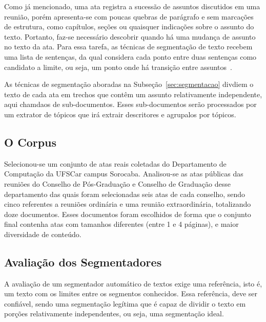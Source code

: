 Como já mencionado, uma ata registra a sucessão de assuntos discutidos em uma reunião, porém apresenta-se com poucas quebras de parágrafo e sem marcações de estrutura, como capítulos, seções ou quaisquer indicações sobre o assunto do texto. Portanto, faz-se necessário descobrir quando há uma mudança de assunto no texto da ata. Para essa tarefa, as técnicas de segmentação de texto recebem uma lista de sentenças, da qual considera cada ponto entre duas sentenças como candidato a limite, ou seja, um ponto onde há transição entre assuntos~\cite{Bokaei2015, Bokaei2016, Misra2009, Sakahara2014}.

As técnicas de segmentação aboradas na Subseção~\ref{sec:segmentacao} divdiem o texto de cada ata em trechos que contêm um assunto relativamente independente, aqui chamdaos de sub-documentos. Esses sub-documentos serão processados por um extrator de tópicos que irá extrair descritores e agrupalos por tópicos.









\subsection{O Corpus}


Selecionou-se um conjunto de atas reais coletadas do Departamento de Computação da UFSCar campus Sorocaba. Analisou-se as atas públicas das reuniões do Conselho de Pós-Graduação e Conselho de Graduação desse departamento das quais foram selecionadas seis atas de cada conselho, sendo cinco referentes a reuniões ordinária e uma reunião extraordinária, totalizando doze documentos. Esses documentos foram escolhidos de forma que o conjunto final contenha atas com tamanhos diferentes (entre 1 e 4 páginas), e maior diversidade de conteúdo.




\subsection{Avaliação dos Segmentadores}

A avaliação de um segmentador automático de textos exige uma referência, isto é, um texto com os limites entre os segmentos conhecidos. Essa referência, deve ser confiável, sendo uma segmentação legítima que é capaz de dividir o texto em porções relativamente independentes, ou seja, uma segmentação ideal.



